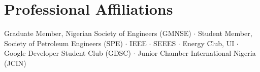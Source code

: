 \documentclass[10pt, a4paper]{article}
\begin{document}
\section{Professional Affiliations}

\noindent Graduate Member, Nigerian Society of Engineers (GMNSE) $\cdot$ Student Member, Society of
Petroleum Engineers (SPE) $\cdot$ IEEE $\cdot$ SEEES $\cdot$ Energy Club, UI $\cdot$ Google Developer
Student Club (GDSC) $\cdot$ Junior Chamber International Nigeria (JCIN)
\end{document}
